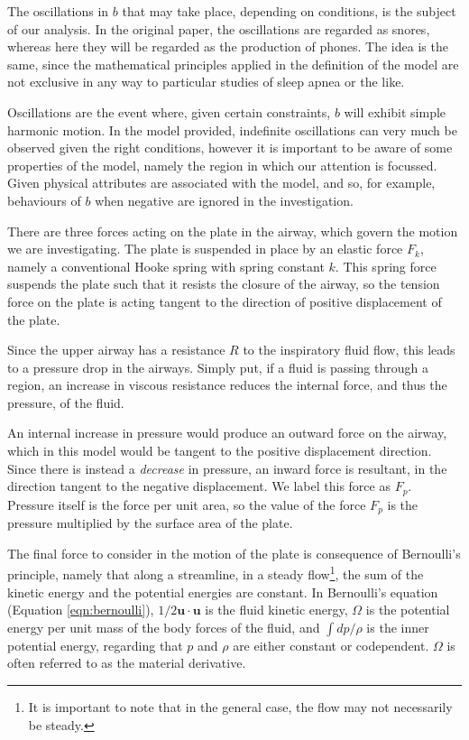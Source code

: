 \documentclass{article}
\begin{document}

The oscillations in $b$ that may take place, depending on conditions, is the subject of our analysis.
In the original paper, the oscillations are regarded as snores,
whereas here they will be regarded as the production of phones.
The idea is the same, since the mathematical principles applied in the definition of the model are not exclusive in any way to particular studies of sleep apnea or the like.

Oscillations are the event where, given certain constraints, $b$ will exhibit simple harmonic motion. %
In the model provided, indefinite oscillations can very much be observed given the right conditions,
however it is important to be aware of some properties of the model,
namely the region in which our attention is focussed. Given physical attributes are associated with the model,
and so, for example, behaviours of $b$ when negative are ignored in the investigation.

There are three forces acting on the plate in the airway, which govern the motion we are investigating.
The plate is suspended in place by an elastic force $F_k$, namely a conventional Hooke spring with spring constant $k$.
This spring force suspends the plate such that it resists the closure of the airway,
so the tension force on the plate is acting tangent to the direction of positive displacement of the plate.


Since the upper airway has a resistance $R$ to the inspiratory fluid flow,
this leads to a pressure drop in the airways.
Simply put, if a fluid is passing through a region,
an increase in viscous resistance reduces the internal force, and thus the pressure, of the fluid.

An internal increase in pressure would produce an outward force on the airway,
which in this model would be tangent to the positive displacement direction.
Since there is instead a \textit{decrease} in pressure, an inward force is resultant,
in the direction tangent to the negative displacement. We label this force as $F_p$.
Pressure itself is the force per unit area,
so the value of the force $F_p$ is the pressure multiplied by the surface area of the plate.

The final force to consider in the motion of the plate is consequence of Bernoulli's principle,
namely that along a streamline, in a steady flow\footnote{It is important to note that in the general case, the flow may not necessarily be steady.},
the sum of the kinetic energy and the potential energies are constant.
In Bernoulli's equation (Equation \ref{eqn:bernoulli}), $1/2\mathbf{u}\cdot\mathbf{u}$ is the fluid kinetic energy,
$\Omega$ is the potential energy per unit mass of the body forces of the fluid,
and $\int dp/\rho$ is the inner potential energy, regarding that $p$ and $\rho$ are either constant or codependent.
$\Omega$ is often referred to as the material derivative.
\end{document}
